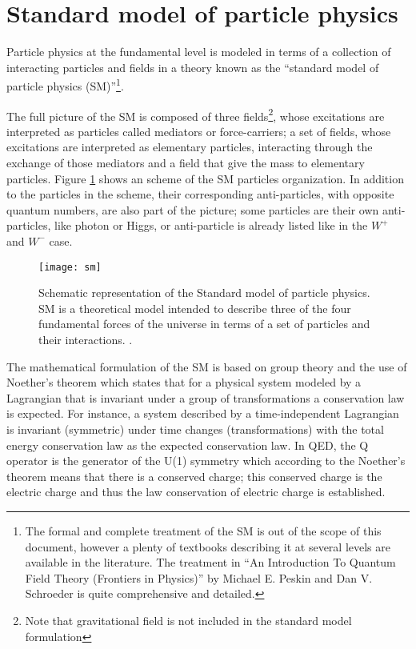 \section{Standard model of particle physics}
\label{secc:SM}

\noindent Particle physics at the fundamental level is modeled in terms of a collection of interacting particles and fields in a theory known as the ``standard model of particle physics (SM)''\footnote{The formal and complete treatment of the SM is out of the scope of this document, however a plenty of textbooks describing it at several levels are available in the literature. The treatment in ``An Introduction To Quantum Field Theory (Frontiers in Physics)'' by  Michael E. Peskin and Dan V. Schroeder is quite comprehensive and detailed.}.

\noindent The full picture of the SM is composed of three fields\footnote{Note that gravitational field is not included in the standard model formulation}, whose excitations are interpreted as particles called mediators or force-carriers; a set of fields, whose excitations are interpreted as elementary particles, interacting through the exchange of those mediators and a field that give the mass to elementary particles. Figure \ref{sm} shows an scheme of the SM particles organization. In addition to the particles in the scheme, their corresponding anti-particles, with opposite quantum numbers, are also part of the picture; some particles are their own anti-particles, like photon or Higgs, or anti-particle is already listed like in the $W^+$  and $W^-$ case.\\

\begin{figure}[h!]
  \centering
  \texttt{[image: sm]}
  \caption[Standard model of particle physics.]{Schematic representation of the Standard model of particle physics. SM is a theoretical model intended to describe three of the four fundamental forces of the universe in terms of a set of particles and their interactions. \cite{smpicture}.}
  \label{sm}
\end{figure}

\noindent The mathematical formulation of the SM is based on group theory and the use of Noether's theorem\cite{noether} which states that for a physical system modeled by a Lagrangian that is invariant under a group of transformations a conservation law is expected. For instance, a system described by a time-independent Lagrangian is invariant (symmetric) under time changes (transformations) with the total energy conservation law as the expected conservation law. In QED, the Q operator is the generator of the U(1) symmetry which according to the Noether's theorem means that there is a conserved charge; this conserved charge is the electric charge and thus the law conservation of electric charge is established.\\


